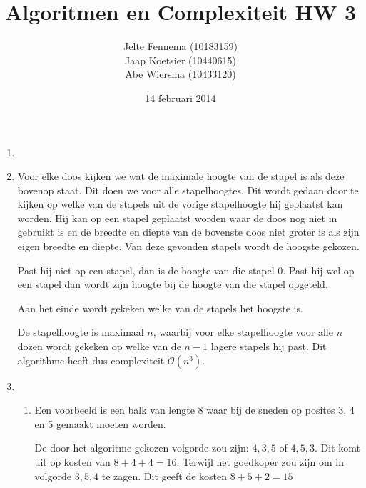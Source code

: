 \documentclass[11pt]{article}
\title{\textbf{Algoritmen en Complexiteit HW 3}}
\author{Jelte Fennema (10183159)\\
		Jaap Koetsier (10440615)\\
        Abe Wiersma (10433120)}
\date{14 februari 2014}
\newcommand{\bigO}{\ensuremath{\mathcal{O}}}
\begin{document}
\maketitle

\begin{enumerate}
    \item

    \item
        Voor elke doos kijken we wat de maximale hoogte van de stapel is als
        deze bovenop staat. Dit doen we voor alle stapelhoogtes. Dit wordt
        gedaan door te kijken op welke van de stapels uit de vorige stapelhoogte
        hij geplaatst kan worden. Hij kan op een stapel geplaatst worden waar de
        doos nog niet in gebruikt is en de breedte en diepte van de bovenste
        doos niet groter is als zijn eigen breedte en diepte. Van deze gevonden
        stapels wordt de hoogste gekozen.

        Past hij niet op een stapel, dan is de hoogte van die stapel 0. Past hij
        wel op een stapel dan wordt zijn hoogte bij de hoogte van die stapel
        opgeteld.

        Aan het einde wordt gekeken welke van de stapels het hoogste is.

        De stapelhoogte is maximaal $n$, waarbij voor elke stapelhoogte voor
        alle $n$ dozen wordt gekeken op welke van de $n - 1$ lagere stapels hij
        past. Dit algorithme heeft dus complexiteit \bigO$(n^3)$.

    \item
        \begin{enumerate}
            \item
                Een voorbeeld is een balk van lengte 8 waar bij de sneden op
                posites 3, 4 en 5 gemaakt moeten worden.

                De door het algoritme gekozen volgorde zou zijn: $4, 3, 5$ of
                $4, 5, 3$. Dit komt uit op kosten van $8+4+4=16$. Terwijl het
                goedkoper zou zijn om in volgorde $3, 5, 4$ te zagen. Dit geeft
                de kosten $8+5+2=15$


\end{enumerate}
\end{enumerate}
\end{document}
